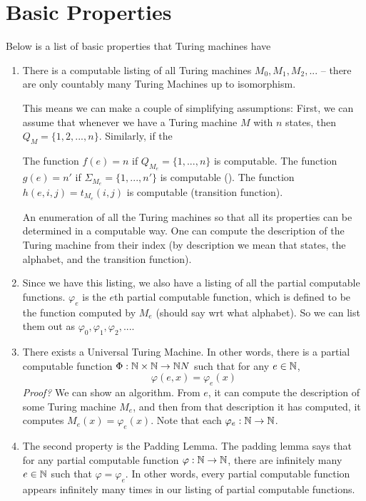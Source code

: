 \section{Basic Properties}
Below is a list of basic properties that Turing machines have
\begin{enumerate}
    \item There is a computable listing of all Turing machines $M_0, M_1, M_2, ...$ -- there are only countably many Turing Machines up to isomorphism.

    This means we can make a couple of simplifying assumptions:
    First, we can assume that whenever we have a Turing machine $M$ with $n$ states, then $Q_M = \{1, 2, ..., n\}$.
    Similarly, if the 


    The function $f(e) = n$ if $Q_{M_{e}} = \{1, ..., n\}$ is computable.
    The function $g(e) = n'$ if $\Sigma_{M_{e}} = \{1, ..., n'\}$ is computable ().
    The function $h(e, i, j) = t_{M_e}(i, j)$ is computable (transition function).

    An enumeration of all the Turing machines so that all its properties can be determined in a computable way.
    One can compute the description of the Turing machine from their index (by description we mean that states, the alphabet, and the transition function).
    
    \item Since we have this listing, we also have a listing of all the partial computable functions.
    $\varphi_e$ is the $e$th partial computable function, which is defined to be the function computed by $M_e$ (should say wrt what alphabet).
    So we can list them out as $\varphi_0, \varphi_1, \varphi_2, ...$.

    \item There exists a Universal Turing Machine.
    In other words, there is a partial computable function $\Phi:\mathbb N \times \mathbb N \to \mathbb N N$ such that for any $e \in \mathbb N$,
    $$\varphi(e, x) = \varphi_e(x)$$
    \textit{Proof?} We can show an algorithm.
    From $e$, it can compute the description of some Turing machine $M_e$, and then from that description it has computed, it computes $M_e(x) = \varphi_e(x)$.
    Note that each $\varphi_e : \mathbb N \to \mathbb N$.

    \item The second property is the Padding Lemma.
    The padding lemma says that for any partial computable function $\varphi : \mathbb N \to \mathbb N$, there are infinitely many $e \in \mathbb N$ such that $\varphi = \varphi_e$.
    In other words, every partial computable function appears infinitely many times in our listing of partial computable functions.


\end{enumerate}
